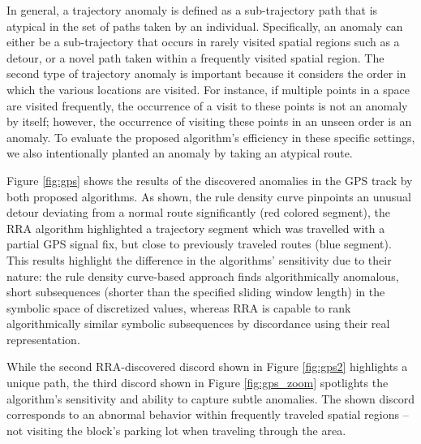 \documentclass{sig-alternate}
\begin{document}
In general, a trajectory anomaly is defined as a sub-trajec\-tory path that is atypical in the set of paths taken by an individual. Specifically, an anomaly can either be a sub-trajectory that occurs in rarely visited spatial regions such as a detour, or a novel path taken within a frequently visited spatial region. The second type of trajectory anomaly is important because it considers the order in which the various locations are visited. For instance, if multiple points in a space are visited frequently, the occurrence of a visit to these points is not an anomaly by itself; however, the occurrence of visiting these points in an unseen order is an anomaly. To evaluate the proposed algorithm's efficiency in these specific settings, we also intentionally planted an anomaly by taking an atypical route.

Figure \ref{fig:gps} shows the results of the discovered anomalies in the GPS track by both proposed algorithms. As shown, the rule density curve pinpoints an unusual detour deviating from a normal route significantly (red colored segment), the RRA algorithm highlighted a trajectory segment which was travelled with a partial GPS signal fix, but close to previously traveled routes (blue segment). This results highlight the difference in the algorithms' sensitivity due to their nature: the rule density curve-based approach finds algorithmically anomalous, short subsequences (shorter than the specified sliding window length) in the symbolic space of discretized values, whereas RRA is capable to rank algorithmically similar symbolic subsequences by discordance using their real representation.

While the second RRA-discovered discord shown in Figure \ref{fig:gps2} highlights a unique path, the third discord shown in Figure \ref{fig:gps_zoom} spotlights the algorithm's sensitivity and ability to capture subtle anomalies. The shown discord corresponds to an abnormal behavior within frequently traveled spatial regions -- not visiting the block's parking lot when traveling through the area. 

\end{document}
